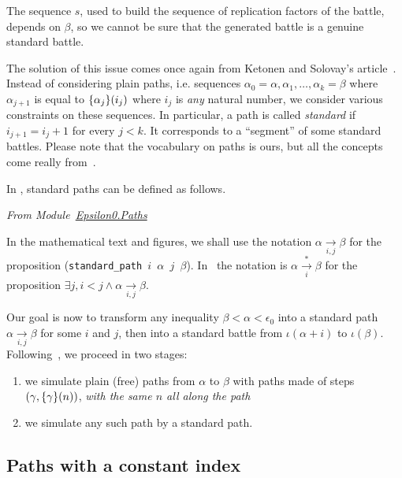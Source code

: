 The sequence $s$, used to build the sequence of replication factors of the battle, depends on 
$\beta$, so we cannot be sure that the generated battle is a genuine standard battle.


The solution of this issue comes  once again from Ketonen and Solovay's article~\cite{KS81}. Instead of considering plain paths, i.e. sequences 
$\alpha_0=\alpha,\alpha_1,\dots,\alpha_k=\beta$ where $\alpha_{j+1}$ is equal
to $\mbox{$\{\alpha_j\}(i_j)$}$ where $i_j$ is \emph{any} natural number, 
we consider various constraints on these sequences.
In particular, a path is called \emph{standard} if $i_{j+1} = i_j + 1$ for every $j<k$.
It  corresponds to a ``segment'' of some standard battles. 
Please note that the vocabulary on paths is ours, but all the concepts come really from~\cite{KS81}.

In \coq{}, standard paths can be defined as follows.

\vspace{4pt}
\emph{From
Module~\href{../theories/html/hydras.Epsilon0.Paths.html}{Epsilon0.Paths}}



In the mathematical text and figures, we shall use the notation 
$\alpha \xrightarrow[i,j]{}\beta$ for the proposition 
(\texttt{standard\_path $i$ $\alpha$ $j$ $\beta$}).
In~\cite{KS81} the notation is
$\alpha \xrightarrow[i]{*}\beta$
for 
the proposition  $\exists j, i<j \wedge \alpha \xrightarrow[i,j]{} \beta$.



Our goal is now  to transform any inequality $\beta<\alpha<\epsilon_0$ into a standard path $\alpha \xrightarrow[i,j]{} \beta$ for some $i$ and $j$, then into a standard battle
from $\iota(\alpha+i)$ to $\iota(\beta)$. 
Following~\cite{KS81}, we proceed in two stages:
\begin{enumerate}
\item we simulate plain (free) paths from $\alpha$ to $\beta$ with
paths made of steps $(\gamma,\mbox{$\{\gamma\}(n)$})$, \emph{with the same $n$ all along the path}
\item we simulate any such path by a standard path.
\end{enumerate}



\subsection{Paths with a constant index}

